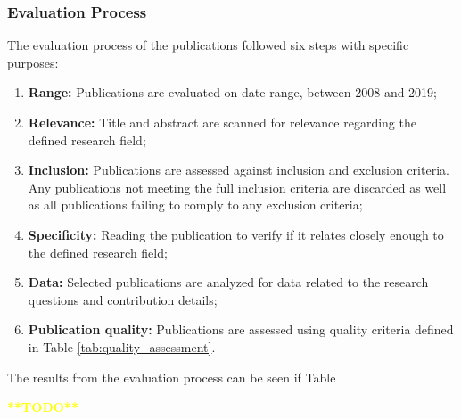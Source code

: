 \subsubsection{Evaluation Process}\label{sec:evaluation_process}

The evaluation process of the publications followed six steps with specific purposes:

\begin{enumerate}
    \item \textbf{Range:} Publications are evaluated on date range, between 2008 and 2019;
    \item \textbf{Relevance:} Title and abstract are scanned for relevance regarding the defined research field;
    \item \textbf{Inclusion:} Publications are assessed against inclusion and exclusion criteria. Any publications not meeting the full inclusion criteria are discarded as well as all publications failing to comply to any exclusion criteria;
    \item \textbf{Specificity:} Reading the publication to verify if it relates closely enough to the defined research field; 
    \item \textbf{Data:} Selected publications are analyzed for data related to the research questions and contribution details;
    \item \textbf{Publication quality:} Publications are assessed using quality criteria defined in Table \ref{tab:quality_assessment}.
\end{enumerate}{}

The results from the evaluation process can be seen if Table 

\captionsetup{belowskip=12pt,aboveskip=4pt}
\begin{table}[ht]
    \centering
    \caption{Publications per step}
    \label{tab:evaluation_process_results}
\end{table}{}
\textcolor{yellow}{\textbf{**TODO**}}


